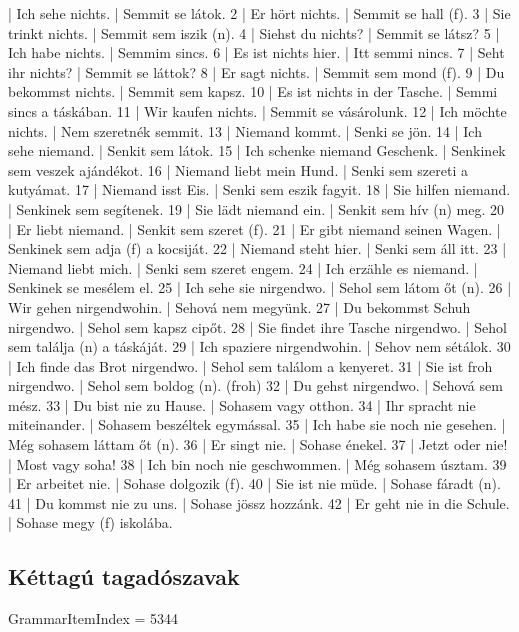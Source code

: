 \documentclass{article}
\newenvironment{exmp}{\verbatim}{\endverbatim}
\begin{document}
\begin{exmp}
1 | Ich sehe nichts. | Semmit se látok.
2 | Er hört nichts. | Semmit se hall (f).
3 | Sie trinkt nichts. | Semmit sem iszik (n).
4 | Siehst du nichts? | Semmit se látsz?
5 | Ich habe nichts. | Semmim sincs.
6 | Es ist nichts hier. | Itt semmi nincs.
7 | Seht ihr nichts? | Semmit se láttok?
8 | Er sagt nichts. | Semmit sem mond (f).
9 | Du bekommst nichts. | Semmit sem kapsz.
10 | Es ist nichts in der Tasche. | Semmi sincs a táskában.
11 | Wir kaufen nichts. | Semmit se vásárolunk.
12 | Ich möchte nichts. | Nem szeretnék semmit.
13 | Niemand kommt. | Senki se jön.
14 | Ich sehe niemand. | Senkit sem látok.
15 | Ich schenke niemand Geschenk. | Senkinek sem veszek ajándékot.
16 | Niemand liebt mein Hund. | Senki sem szereti a kutyámat.
17 | Niemand isst Eis. | Senki sem eszik fagyit.
18 | Sie hilfen niemand. | Senkinek sem segítenek.
19 | Sie lädt niemand ein. | Senkit sem hív (n) meg.
20 | Er liebt niemand. | Senkit sem szeret (f).
21 | Er gibt niemand seinen Wagen. | Senkinek sem adja (f) a kocsiját.
22 | Niemand steht hier. | Senki sem áll itt.
23 | Niemand liebt mich. | Senki sem szeret engem.
24 | Ich erzähle es niemand. | Senkinek se mesélem el.
25 | Ich sehe sie nirgendwo. | Sehol sem látom őt (n).
26 | Wir gehen nirgendwohin. | Sehová nem megyünk.
27 | Du bekommst Schuh nirgendwo. | Sehol sem kapsz cipőt.
28 | Sie findet ihre Tasche nirgendwo. | Sehol sem találja (n) a táskáját.
29 | Ich spaziere nirgendwohin. | Sehov nem sétálok.
30 | Ich finde das Brot nirgendwo. | Sehol sem találom a kenyeret.
31 | Sie ist froh nirgendwo. | Sehol sem boldog (n). (froh)
32 | Du gehst nirgendwo. | Sehová sem mész.
33 | Du bist nie zu Hause. | Sohasem vagy otthon.
34 | Ihr spracht nie miteinander. | Sohasem beszéltek egymással.
35 | Ich habe sie noch nie gesehen. | Még sohasem láttam őt (n).
36 | Er singt nie. | Sohase énekel.
37 | Jetzt oder nie! | Most vagy soha!
38 | Ich bin noch nie geschwommen. | Még sohasem úsztam.
39 | Er arbeitet nie. | Sohase dolgozik (f).
40 | Sie ist nie müde. | Sohase fáradt (n).
41 | Du kommst nie zu uns. | Sohase jössz hozzánk.
42 | Er geht nie in die Schule. | Sohase megy (f) iskolába.
\end{exmp}

\subsection{Kéttagú tagadószavak}

GrammarItemIndex = 5344
\end{document}
